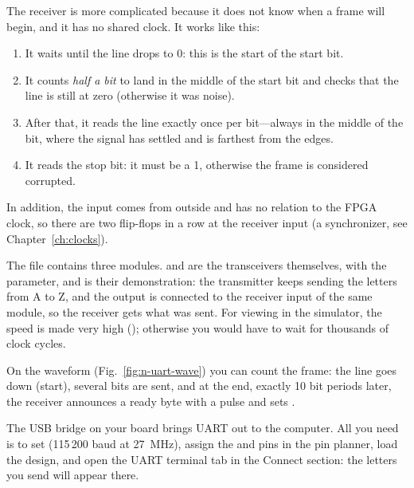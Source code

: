 The receiver is more complicated because it does not know when a frame will
begin, and it has no shared clock. It works like this:

\begin{enumerate}
  \item It waits until the line drops to 0: this is the start of the start bit.
  \item It counts \emph{half a bit} to land in the middle of the start bit and
        checks that the line is still at zero (otherwise it was noise).
  \item After that, it reads the line exactly once per bit---always in the middle
        of the bit, where the signal has settled and is farthest from the edges.
  \item It reads the stop bit: it must be a 1, otherwise the frame is considered
        corrupted.
\end{enumerate}

In addition, the  input comes from outside and has no relation to the
FPGA clock, so there are two flip-flops in a row at the receiver input (a
synchronizer, see Chapter~\ref{ch:clocks}).


The file contains three modules.  and  are the
transceivers themselves, with the  parameter, and
 is their demonstration: the transmitter keeps sending the
letters from A to Z, and the  output is connected to the receiver
input of the same module, so the receiver gets what was sent. For viewing in
the simulator, the speed is made very high ();
otherwise you would have to wait for thousands of clock cycles.


On the waveform (Fig.~\ref{fig:n-uart-wave}) you can count the frame: the line
goes down (start), several bits are sent, and at the end, exactly 10 bit
periods later, the receiver announces a ready byte with a 
pulse and sets .

\begin{infobox}
The USB bridge on your board brings UART out to the computer. All you need is
to set  (115\,200 baud at 27~MHz), assign the
 and  pins in the pin planner, load the design, and open the
UART terminal tab in the Connect section: the letters you send will appear
there.
\end{infobox}

